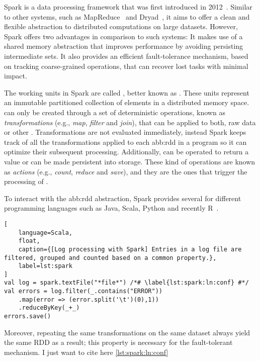 \label{sec:spark}


Spark is a data processing framework that was first introduced in 2012~\cite{Zaharia2012a}. Similar to other systems, such as MapReduce~\cite{Dean2004} and Dryad~\cite{Isard2007}, it aims to offer a clean and flexible abstraction to distributed computations on large datasets. However, Spark offers two advantages in comparison to such systems: It makes use of a shared memory abstraction that improves performance by avoiding persisting intermediate sets. It also provides an efficient fault-tolerance mechanism, based on tracking coarse-grained operations, that can recover lost tasks with minimal impact.

The working units in Spark are called \textit{}, better known as . These units represent an immutable partitioned collection of elements in a distributed memory space.  can only be created through a set of deterministic operations, known as \textit{transformations} (e.g., \textit{map}, \textit{filter} and \textit{join}), that can be applied to both, raw data or other . Transformations are not evaluated immediately, instead Spark keeps track of all the transformations applied to each \acrshort{abb:rdd} in a program so it can optimize their subsequent processing. Additionally,  can be operated to return a value or can be made persistent into storage. These kind of operations are known as \textit{actions} (e.g., \textit{count}, \textit{reduce} and \textit{save}), and they are the ones that trigger the processing of .

To interact with the \acrshort{abb:rdd} abstraction, Spark provides several  for different programming languages such as Java, Scala, Python and recently R~\cite{Venkataraman2016}.

\begin{lstlisting}[
	language=Scala,
	float,
	caption={[Log processing with Spark] Entries in a log file are filtered, grouped and counted based on a common property.},
	label=lst:spark
]
val log = spark.textFile("*file*") /*# \label{lst:spark:ln:conf} #*/
val errors = log.filter(_.contains("ERROR")) 
	.map(error => (error.split('\t')(0),1))
	.reduceByKey(_+_)
errors.save()
\end{lstlisting}

Moreover, repeating the same transformations on the same dataset always yield the same RDD as a result; this property is necessary for the fault-tolerant mechanism. I just want to cite here \ref{lst:spark:ln:conf}

